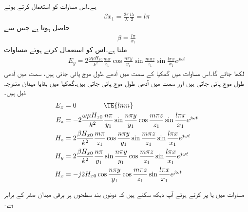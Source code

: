 ہے۔اس مساوات کو استعمال کرتے ہوئے
\begin{align*}
\beta x_1 = \frac{2\pi}{\lambda} \frac{l \lambda}{2}=l \pi
\end{align*}
حاصل ہوتا ہے جس سے
\begin{align}\label{مساوات_مویج_گمکی_زاویائی_مستقل}
\beta=\frac{l \pi}{x_1}
\end{align}
ملتا ہے۔اس کو استعمال کرتے ہوئے مساوات  
\begin{align}\label{مساوات_مویج_گمکی_برقی_ب}
E_y=2 \frac{\omega \mu H_{x0}}{k^2}\frac{m \pi}{z_1}\cos \frac{n\pi y}{y_1} \sin \frac{m \pi z}{z_1} \sin \frac{l \pi x}{x_1}  e^{j\omega t}
\end{align}
لکھا جائے گا۔اس مساوات میں گمکیا کے  سمت میں  آدھے طول موج پائی جاتی ہیں،  سمت میں  آدھی طول موج پائی جاتی ہیں اور  سمت میں  آدھی طول موج پائی جاتی ہیں۔گمکیا میں بقایا میدان مندرجہ ذیل ہیں۔
\begin{align}
E_x&=0 \quad \quad \quad \quad \TE{lnm} \\
E_z&=-2 \frac{\omega \mu H_{x0}}{k^2}\frac{n \pi}{y_1}\sin \frac{n\pi y}{y_1} \cos \frac{m \pi z}{z_1} \sin \frac{l \pi x}{x_1}  e^{j\omega t}\label{مساوات_مویج_دوسرا_برقی_جزو}\\
H_z&=2 \frac{\beta   H_{x0}}{k^2}\frac{m \pi}{z_1}\cos \frac{n\pi y}{y_1} \sin \frac{m \pi z}{z_1} \sin \frac{l \pi x}{x_1}  e^{j\omega t}\label{مساوات_مویج_مقناطیسی_جزو_پ}\\
H_y&=2 \frac{\beta  H_{x0}}{k^2}\frac{n \pi}{y_1}\sin \frac{n\pi y}{y_1} \cos \frac{m \pi z}{z_1} \sin \frac{l \pi x}{x_1}  e^{j\omega t}\label{مساوات_مویج_مقناطیسی_جزو_ب}\\
H_x&=-j 2 H_{x0} \cos \frac{n\pi y}{y_1} \cos \frac{m \pi  z}{z_1} \sin \frac{l \pi x}{x_1} e^{j \omega t} \label{مساوات_مویج_مقناطیسی_جزو_الف}
\end{align}

مساوات  میں  یا  پر کرتے ہوئے آپ دیکھ سکتے ہیں کہ دونوں بند سطحوں پر برقی میدان صفر کے برابر ہے۔

